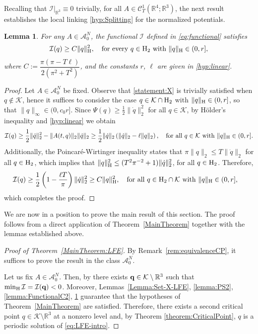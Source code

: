 \documentclass{article}
\newcommand{\boK}{\mathcal{K}}
\newcommand{\boI}{\mathcal{I}}
\newcommand{\R}{\mathbb{R}}
\newcommand{\boA}{\mathcal{A}}
\newcommand{\dq}{\dot{q}}
\newcommand{\Hilb}{{\textnormal H}}
\newcommand{\minq}{{\bf q}}
\newtheorem{lemma}{Lemma}[section]
\theoremstyle{definition}
\begin{document}
	Recalling that $\boI|_{\R^3}\equiv0$ trivially, for all $A\in\mathcal{C}^1_T(\R^4;\R^3)$, the next result establishes the local linking \eqref{hyp:Splitting} for the normalized potentials. 
	
	\begin{lemma}\label{lemma:splitting}
		For any $A\in\boA_0^N$, the functional $\boI$ defined in \eqref{eq:functional} satisfies 
		\begin{equation}\label{statement:X}
			\boI(q)\geq C \|q\|_\Hilb^2, \quad\text{for every }q\in\Hilb_2\text{ with }\|q\|_\Hilb\in(0,r],
		\end{equation}
		where $C:=\dfrac{\pi(\pi-T\ell)}{2(\pi^2+T^2)}$, and the constants $r$, $\ell$ are given in \eqref{hyp:linear}.
	\end{lemma}
	\begin{proof}
		Let $A\in\mathcal{A}_0^N$ be fixed.
		Observe that \eqref{statement:X} is trivially satisfied when $q\notin\boK$, hence it suffices to consider the case $q\in\boK\cap\Hilb_2$ with $\|q\|_\Hilb\in(0,r]$, so that $\|q\|_\infty\in (0,c_0r]$. Since $\Psi(q)\geq \frac12\|\dq\|_2^2$ for all $q\in\boK$, by Hölder’s inequality and \eqref{hyp:linear} we obtain
		\begin{align}
			\boI(q)\geq\frac12\|\dq\|_2^2 - \|A(t,q)\|_2 \|\dq\|_2\geq \frac12\|\dq\|_2\left(\|\dq\|_2 - \ell \|q\|_2\right),\quad\hbox{for all }q\in\boK\hbox{ with }\|q\|_\Hilb\in(0,r].
		\end{align}
		Additionally, the Poincaré-Wirtinger inequality states that $\pi    \|q\|_2\leq T \|\dq\|_2$ for all $q\in \Hilb_2$,
		which implies that
		$\|q\|^2_\Hilb\leq(T^2\pi^{-2}+1) \|\dq\|^2_2$, for all $q\in\Hilb_2$. Therefore, 
		\begin{align*}
			\boI(q)&\geq \frac12\left(1-\frac{\ell T}{\pi}\right)\|\dq\|_2^2\geq C \|q\|_\Hilb^2 ,\quad\hbox{for all }q\in\Hilb_2\cap\boK\hbox{ with }\|q\|_\Hilb\in(0,r],
		\end{align*} 
		which completes the proof. 
	\end{proof}
	We are now in a position to prove the main result of this section. The proof follows from a direct application of Theorem~\ref{MainTheorem} together with the lemmas established above.

\begin{proof}[Proof of Theorem~\ref{MainTheorem:LFE}]
		By Remark~\ref{rem:equivalenceCP}, it suffices to prove the result in the class $\mathcal{A}^N_0$. 
        
        Let us fix $A\in\mathcal{A}^N_0$. Then, by \cite[Theorem 2.1]{GLM} there exists $\minq \in \boK\setminus\R^3$ such that $\min_{\Hilb}\boI=\boI(\minq)<0$. Moreover, Lemmas~\ref{Lemma:Set-X-LFE},  \ref{lemma:PS2}, \ref{lemma:FunctionalC2}, \ref{lemma:splitting} guarantee that the hypotheses of Theorem~\ref{MainTheorem} are satisfied. Therefore, there exists a second critical point $q\in\boK\setminus\R^3$ at a nonzero level and, by Theorem \ref{theorem:CriticalPoint}, $q$ is a periodic solution of \eqref{eq:LFE-intro}.
        \end{proof}
		
\end{document}
